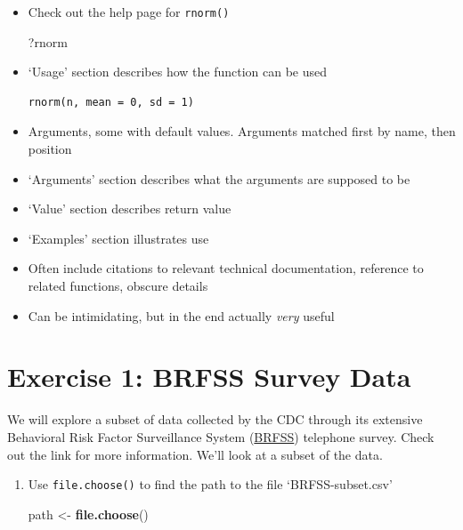\documentclass[]{article}
\newenvironment{Shaded}{\begin{snugshade}}{\end{snugshade}}
\newcommand{\KeywordTok}[1]{\textcolor[rgb]{0.13,0.29,0.53}{\textbf{#1}}}
\newcommand{\StringTok}[1]{\textcolor[rgb]{0.31,0.60,0.02}{#1}}
\newcommand{\NormalTok}[1]{#1}
\theoremstyle{definition}
\theoremstyle{definition}
\theoremstyle{remark}
\begin{document}
\begin{itemize}
\item
  Check out the help page for \texttt{rnorm()}

\begin{Shaded}
\begin{Highlighting}[]
\NormalTok{?rnorm}
\end{Highlighting}
\end{Shaded}
\item
  `Usage' section describes how the function can be used

\begin{verbatim}
rnorm(n, mean = 0, sd = 1)
\end{verbatim}
\item
  Arguments, some with default values. Arguments matched first by name,
  then position
\item
  `Arguments' section describes what the arguments are supposed to be
\item
  `Value' section describes return value
\item
  `Examples' section illustrates use
\item
  Often include citations to relevant technical documentation, reference
  to related functions, obscure details
\item
  Can be intimidating, but in the end actually \emph{very} useful
\end{itemize}

\section{Exercise 1: BRFSS Survey
Data}\label{exercise-1-brfss-survey-data}

We will explore a subset of data collected by the CDC through its
extensive Behavioral Risk Factor Surveillance System
(\href{http://www.cdc.gov/brfss/about/index.htm}{BRFSS}) telephone
survey. Check out the link for more information. We'll look at a subset
of the data.

\begin{enumerate}
\def\labelenumi{\arabic{enumi}.}
\item
  Use \texttt{file.choose()} to find the path to the file
  `BRFSS-subset.csv'

\begin{Shaded}
\begin{Highlighting}[]
\NormalTok{path <-}\StringTok{ }\KeywordTok{file.choose}\NormalTok{()}
\end{Highlighting}
\end{Shaded}
\end{enumerate}
\end{document}
